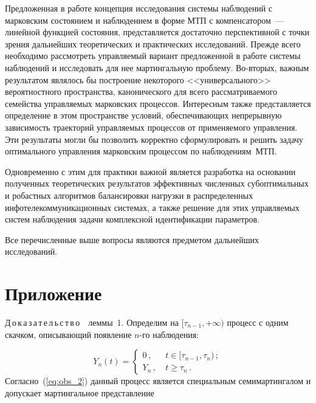 \begin{multicols}{2}
  Предложенная в работе концепция иссле\-до\-вания системы наблюдений с марковским
  со\-сто\-янием и наблюдением в форме МТП с компенсатором~--- линейной функцией
  со\-сто\-яния, представляет\-ся достаточно перспективной с точки зрения дальнейших
  теоретических и практических исследований. Прежде всего необходимо рас\-смот\-реть
  управ\-ля\-емый вариант предложенной в работе сис\-те\-мы наблюдений и исследовать для
  нее мартингальную проб\-ле\-му. Во-вто\-рых, важным ре\-зультатом являлось бы построение
  некоторого <<универсального>> вероятностного пространства, канонического для
  всего рас\-смат\-ри\-ва\-емо\-го семейства управ\-ля\-емых марковских процессов. Интересным
  \mbox{также} представляется определение в этом пространстве условий, обеспечивающих
  непрерывную зависимость траекторий управ\-ля\-емых процессов от применяемого
  управления. Эти результаты могли бы позволить корректно сформулировать и
  решить задачу оптимального управ\-ле\-ния марковским процессом по наблюдениям~МТП.

  Одновременно с этим для практики важной является разработка на основании
  полученных тео\-ре\-тических результатов эффективных численных субоптимальных
  и робастных алгоритмов балансировки нагрузки в распределенных
  инфотелекоммуникационных сис\-те\-мах, а также решение для этих управляемых
  сис\-тем наблюдения задачи комплексной идентификации параметров.

Все перечисленные выше вопросы являются предметом дальнейших исследований.


 \section*{\raggedleft Приложение}

{\small

\noindent
 Д\,о\,к\,а\,з\,а\,т\,е\,л\,ь\,с\,т\,в\,о\ \ леммы~1.
 Определим на $[\tau_{n-1},+\infty)$ процесс
 с одним скачком, описывающий появление $n$-го наблюдения:

 \vspace*{2pt}

 \noindent
 \begin{equation*}
 Y_n(t) = \begin{cases}
 0\,, &\ t \in [\tau_{n-1},\tau_{n})\,;\\
 Y_n\,, &\ t \geqslant \tau_{n}\,.
\end{cases}
 \end{equation*}
Согласно~(\ref{eq:obs_2}) данный процесс является специальным
семимартингалом и допускает  мартингальное представ\-ление

}
\end{multicols}
